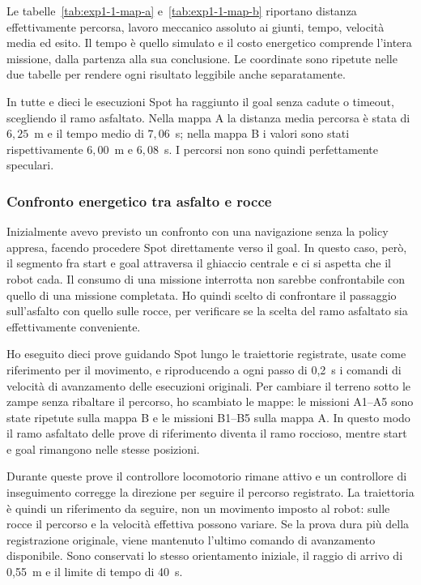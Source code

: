 \documentclass[11pt,a4paper]{article}
\begin{document}
Le tabelle~\ref{tab:exp1-1-map-a} e~\ref{tab:exp1-1-map-b} riportano distanza effettivamente percorsa, lavoro meccanico assoluto ai giunti, tempo, velocità media ed esito. Il tempo è quello simulato e il costo energetico comprende l'intera missione, dalla partenza alla sua conclusione. Le coordinate sono ripetute nelle due tabelle per rendere ogni risultato leggibile anche separatamente.



In tutte e dieci le esecuzioni Spot ha raggiunto il goal senza cadute o timeout, scegliendo il ramo asfaltato. Nella mappa A la distanza media percorsa è stata di $6{,}25$~m e il tempo medio di $7{,}06$~s; nella mappa B i valori sono stati rispettivamente $6{,}00$~m e $6{,}08$~s. I percorsi non sono quindi perfettamente speculari.

\subsubsection{Confronto energetico tra asfalto e rocce}
\label{sec:confronto-binario-asfalto-rocce}

Inizialmente avevo previsto un confronto con una navigazione senza la policy appresa, facendo procedere Spot direttamente verso il goal. In questo caso, però, il segmento fra start e goal attraversa il ghiaccio centrale e ci si aspetta che il robot cada. Il consumo di una missione interrotta non sarebbe confrontabile con quello di una missione completata. Ho quindi scelto di confrontare il passaggio sull'asfalto con quello sulle rocce, per verificare se la scelta del ramo asfaltato sia effettivamente conveniente.

Ho eseguito dieci prove guidando Spot lungo le traiettorie registrate, usate come riferimento per il movimento, e riproducendo a ogni passo di 0,2~s i comandi di velocità di avanzamento delle esecuzioni originali. Per cambiare il terreno sotto le zampe senza ribaltare il percorso, ho scambiato le mappe: le missioni A1--A5 sono state ripetute sulla mappa B e le missioni B1--B5 sulla mappa A. In questo modo il ramo asfaltato delle prove di riferimento diventa il ramo roccioso, mentre start e goal rimangono nelle stesse posizioni.

Durante queste prove il controllore locomotorio rimane attivo e un controllore di inseguimento corregge la direzione per seguire il percorso registrato. La traiettoria è quindi un riferimento da seguire, non un movimento imposto al robot: sulle rocce il percorso e la velocità effettiva possono variare. Se la prova dura più della registrazione originale, viene mantenuto l'ultimo comando di avanzamento disponibile. Sono conservati lo stesso orientamento iniziale, il raggio di arrivo di 0,55~m e il limite di tempo di 40~s.
\end{document}
